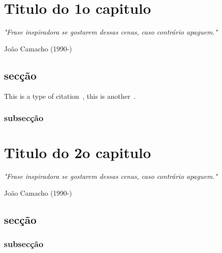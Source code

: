 \documentclass[12pt,a4paper]{ThesisClass}
\begin{document}
\FloatBarrier
\newpage
\chapter{Titulo do 1o capitulo}\label{ch:01cap1}
\begin{center}
\begin{minipage}{15cm}
\textit{"Frase inspiradora se gostarem dessas cenas, caso contrário apaguem."}

\hfill João Camacho (1990-)\\
\end{minipage}
\end{center}

\section{secção}

This is a type of citation~\citep{Abramowitz1972}, this is another~\cite{Blum2013}.


\subsection{subsecção}


\FloatBarrier
\newpage
\chapter{Titulo do 2o capitulo}\label{ch:02cap2}
\begin{center}
\begin{minipage}{15cm}
\textit{"Frase inspiradora se gostarem dessas cenas, caso contrário apaguem."}

\hfill João Camacho (1990-)\\
\end{minipage}
\end{center}

\section{secção}

\subsection{subsecção}
\end{document}
